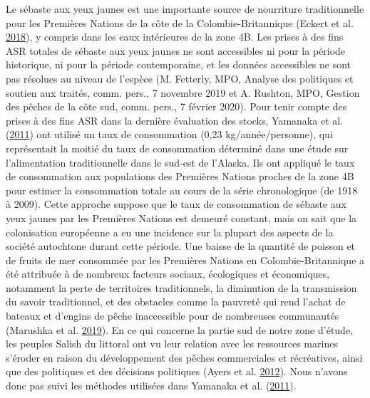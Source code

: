 \documentclass[11pt]{book}
\begin{document}
Le sébaste aux yeux jaunes est une importante source de nourriture traditionnelle pour les Premières Nations de la côte de la Colombie-Britannique (Eckert et al. \protect\hyperlink{ref-eckert2018}{2018}), y compris dans les eaux intérieures de la zone 4B. Les prises à des fins ASR totales de sébaste aux yeux jaunes ne sont accessibles ni pour la période historique, ni pour la période contemporaine, et les données accessibles ne sont pas résolues au niveau de l'espèce (M. Fetterly, MPO, Analyse des politiques et soutien aux traités, comm. pers., 7 novembre 2019 et A. Rushton, MPO, Gestion des pêches de la côte sud, comm. pers., 7 février 2020). Pour tenir compte des prises à des fins ASR dans la dernière évaluation des stocks, Yamanaka et al. (\protect\hyperlink{ref-yamanaka2011}{2011}) ont utilisé un taux de consommation (0,23 kg/année/personne), qui représentait la moitié du taux de consommation déterminé dans une étude sur l'alimentation traditionnelle dans le sud-est de l'Alaska. Ils ont appliqué le taux de consommation aux populations des Premières Nations proches de la zone 4B pour estimer la consommation totale au cours de la série chronologique (de 1918 à 2009). Cette approche suppose que le taux de consommation de sébaste aux yeux jaunes par les Premières Nations est demeuré constant, mais on sait que la colonisation européenne a eu une incidence sur la plupart des aspects de la société autochtone durant cette période. Une baisse de la quantité de poisson et de fruits de mer consommée par les Premières Nations en Colombie-Britannique a été attribuée à de nombreux facteurs sociaux, écologiques et économiques, notamment la perte de territoires traditionnels, la diminution de la transmission du savoir traditionnel, et des obstacles comme la pauvreté qui rend l'achat de bateaux et d'engins de pêche inaccessible pour de nombreuses communautés (Marushka et al. \protect\hyperlink{ref-marushka2019}{2019}). En ce qui concerne la partie sud de notre zone d'étude, les peuples Salish du littoral ont vu leur relation avec les ressources marines s'éroder en raison du développement des pêches commerciales et récréatives, ainsi que des politiques et des décisions politiques (Ayers et al. \protect\hyperlink{ref-ayers2012}{2012}). Nous n'avons donc pas suivi les méthodes utilisées dans Yamanaka et al. (\protect\hyperlink{ref-yamanaka2011}{2011}).
\end{document}
